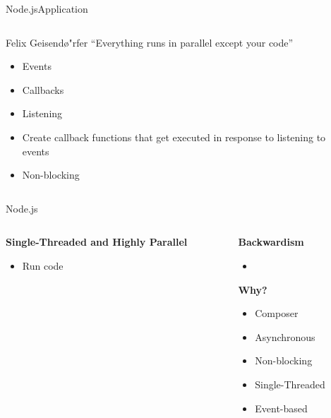 \documentclass[pdf,table]{beamer}
\begin{document}
\begin{frame}{Node.js}{Application}
	\begin{columns}[T]
		\begin{column}{0.48\textwidth}
			\begin{block}{Felix Geisend\o{"}rfer}
				``Everything runs in parallel except your code''
			\end{block}
			\begin{itemize}
				\item Events
				\item Callbacks
				\item Listening
				\item Create callback functions that get executed in response to listening to events
				\item Non-blocking %
			\end{itemize}
		\end{column}
		\begin{column}{0.48\textwidth}
		\end{column}
	\end{columns}	
\end{frame}



\begin{frame}{Node.js}
	\begin{columns}[T]
		\begin{column}{0.48\textwidth}
			{\bf Single-Threaded and Highly Parallel}
			\begin{itemize}
				\item Run code %
			\end{itemize}
		\end{column}
		\begin{column}{0.48\textwidth}
			{\bf Backwardism}
			\begin{itemize}
				\item
			\end{itemize}
			{\bf Why?}
			\begin{itemize}
				\item Composer
				\item Asynchronous 
				\item Non-blocking
				\item Single-Threaded
				\item Event-based
			\end{itemize}
		\end{column}
	\end{columns}	
\end{frame}
\end{document}
